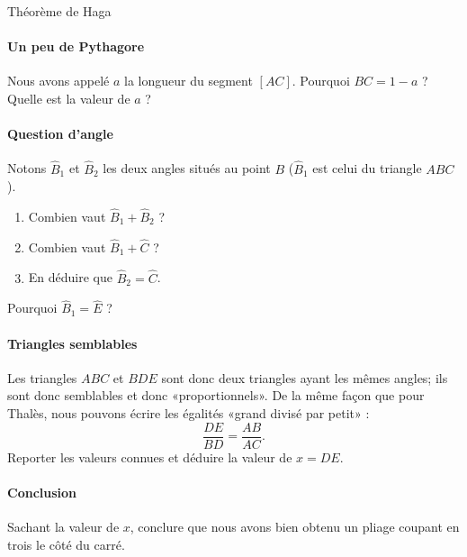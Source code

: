 

\begin{feuilleExo}{Théorème de Haga}

    \begin{center}
    \end{center}

\paragraph{Un peu de Pythagore}


Nous avons appelé \( a\) la longueur du segment \( [AC]\). Pourquoi \( BC=1-a\) ? Quelle est la valeur de \( a\) ?

\paragraph{Question d'angle}

Notons \( \hat B_1\) et \( \hat B_2\) les deux angles situés au point \( B\) (\( \hat B_1\) est celui du triangle \( ABC\)).
\begin{enumerate}
    \item
        Combien vaut \( \hat B_1+\hat B_2\) ?
    \item
        Combien vaut \( \hat B_1+\hat C\) ?
    \item
        En déduire que \( \hat B_2=\hat C\).
\end{enumerate}
Pourquoi \( \hat B_1=\hat E\) ?

\paragraph{Triangles semblables}

Les triangles \( ABC\) et \( BDE\) sont donc deux triangles ayant les mêmes angles; ils sont donc semblables et donc «proportionnels». De la même façon que pour Thalès, nous pouvons écrire les égalités «grand divisé par petit» :
\begin{equation}
    \frac{ DE }{ BD }=\frac{ AB }{ AC }.
\end{equation}
Reporter les valeurs connues et déduire la valeur de \( x=DE\).

\paragraph{Conclusion}

Sachant la valeur de \( x\), conclure que nous avons bien obtenu un pliage coupant en trois le côté du carré.


\end{feuilleExo}
